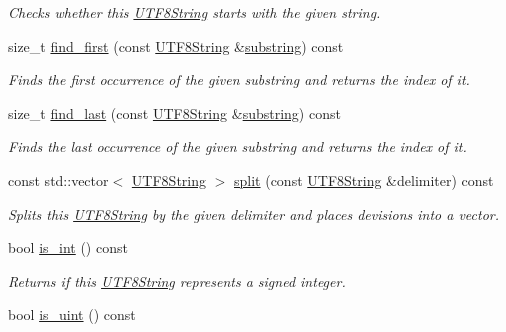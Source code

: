 \begin{DoxyCompactItemize}
\begin{DoxyCompactList}\small\item\em Checks whether this \hyperlink{classchaos_1_1str_1_1_u_t_f8_string}{U\+T\+F8\+String} starts with the given string. \end{DoxyCompactList}\item 
size\+\_\+t \hyperlink{classchaos_1_1str_1_1_u_t_f8_string_a035c9c2a40bcac212ebb20a8524d0b5a}{find\+\_\+first} (const \hyperlink{classchaos_1_1str_1_1_u_t_f8_string}{U\+T\+F8\+String} \&\hyperlink{classchaos_1_1str_1_1_u_t_f8_string_a2d50ab58715264ae175f521816bf670c}{substring}) const 
\begin{DoxyCompactList}\small\item\em Finds the first occurrence of the given substring and returns the index of it. \end{DoxyCompactList}\item 
size\+\_\+t \hyperlink{classchaos_1_1str_1_1_u_t_f8_string_a4053c128303a753735295b441e439933}{find\+\_\+last} (const \hyperlink{classchaos_1_1str_1_1_u_t_f8_string}{U\+T\+F8\+String} \&\hyperlink{classchaos_1_1str_1_1_u_t_f8_string_a2d50ab58715264ae175f521816bf670c}{substring}) const 
\begin{DoxyCompactList}\small\item\em Finds the last occurrence of the given substring and returns the index of it. \end{DoxyCompactList}\item 
const std\+::vector$<$ \hyperlink{classchaos_1_1str_1_1_u_t_f8_string}{U\+T\+F8\+String} $>$ \hyperlink{classchaos_1_1str_1_1_u_t_f8_string_ac5da4c989f6394c38b0fb82a252099db}{split} (const \hyperlink{classchaos_1_1str_1_1_u_t_f8_string}{U\+T\+F8\+String} \&delimiter) const 
\begin{DoxyCompactList}\small\item\em Splits this \hyperlink{classchaos_1_1str_1_1_u_t_f8_string}{U\+T\+F8\+String} by the given delimiter and places devisions into a vector. \end{DoxyCompactList}\item 
\hypertarget{classchaos_1_1str_1_1_u_t_f8_string_a64f529f30034281560805b97826c5e13}{}bool \hyperlink{classchaos_1_1str_1_1_u_t_f8_string_a64f529f30034281560805b97826c5e13}{is\+\_\+int} () const \label{classchaos_1_1str_1_1_u_t_f8_string_a64f529f30034281560805b97826c5e13}

\begin{DoxyCompactList}\small\item\em Returns if this \hyperlink{classchaos_1_1str_1_1_u_t_f8_string}{U\+T\+F8\+String} represents a signed integer. \end{DoxyCompactList}\item 
\hypertarget{classchaos_1_1str_1_1_u_t_f8_string_a989763da3e7eed8664cd2e5c41ea7e00}{}bool \hyperlink{classchaos_1_1str_1_1_u_t_f8_string_a989763da3e7eed8664cd2e5c41ea7e00}{is\+\_\+uint} () const \label{classchaos_1_1str_1_1_u_t_f8_string_a989763da3e7eed8664cd2e5c41ea7e00}


\end{DoxyCompactItemize}

